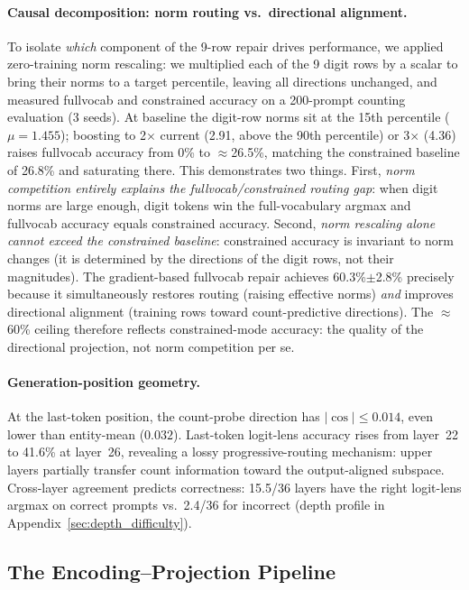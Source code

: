 \documentclass{article}
\begin{document}
\paragraph{Causal decomposition: norm routing vs.\ directional alignment.}
To isolate \emph{which} component of the 9-row repair drives performance,
we applied zero-training norm rescaling: we multiplied each of the 9 digit rows
by a scalar to bring their norms to a target percentile, leaving all directions
unchanged, and measured fullvocab and constrained accuracy on a 200-prompt
counting evaluation (3 seeds).
At baseline the digit-row norms sit at the 15th percentile ($\mu{=}1.455$);
boosting to 2$\times$ current (2.91, above the 90th percentile) or
3$\times$ (4.36) raises fullvocab accuracy from 0\% to $\approx$26.5\%, matching
the constrained baseline of 26.8\% and saturating there.
This demonstrates two things.
First, \emph{norm competition entirely explains the fullvocab/constrained routing gap}:
when digit norms are large enough, digit tokens win the full-vocabulary argmax and
fullvocab accuracy equals constrained accuracy.
Second, \emph{norm rescaling alone cannot exceed the constrained baseline}:
constrained accuracy is invariant to norm changes (it is determined by the
directions of the digit rows, not their magnitudes).
The gradient-based fullvocab repair achieves 60.3\%$\pm$2.8\% precisely because
it simultaneously restores routing (raising effective norms) \emph{and} improves
directional alignment (training rows toward count-predictive directions).
The $\approx$60\% ceiling therefore reflects constrained-mode accuracy: the
quality of the directional projection, not norm competition per se.

\paragraph{Generation-position geometry.}
At the last-token position, the count-probe direction has
$|\cos| \leq 0.014$, even lower than entity-mean ($0.032$).
Last-token logit-lens accuracy rises from layer~22 to 41.6\% at layer~26,
revealing a lossy progressive-routing mechanism:
upper layers partially transfer count information toward the output-aligned
subspace. Cross-layer agreement predicts correctness: 15.5/36 layers
have the right logit-lens argmax on correct prompts vs.\ 2.4/36 for incorrect
(depth profile in Appendix~\ref{sec:depth_difficulty}).

\subsection{The Encoding--Projection Pipeline}
\end{document}
